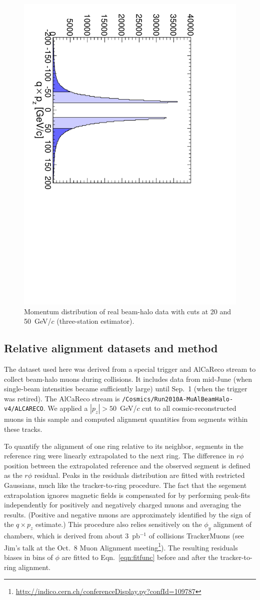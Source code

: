 \documentclass[12pt]{article}
\begin{document}
\begin{figure}
\begin{center}
\includegraphics[height=0.4\linewidth, angle=90]{qpz_spectrum.pdf}
\end{center}

\caption{Momentum distribution of real beam-halo data with cuts at 20
  and 50~GeV/$c$ (three-station estimator). \label{fig:qpz_spectrum}}
\end{figure}

\subsection{Relative alignment datasets and method}

The dataset used here was derived from a special trigger and AlCaReco
stream to collect beam-halo muons during collisions.  It includes data
from mid-June (when single-beam intensities became sufficiently large)
until Sep.~1 (when the trigger was retired).  The AlCaReco stream is
{\tt /Cosmics/Run2010A-MuAlBeamHalo-v4/ALCARECO}.  We applied a $|p_z|
> 50$~GeV/$c$ cut to all cosmic-reconstructed muons in this sample and
computed alignment quantities from segments within these tracks.

To quantify the alignment of one ring relative to its neighbor,
segments in the reference ring were linearly extrapolated to the next
ring.  The difference in $r\phi$ position between the extrapolated
reference and the observed segment is defined as the $r\phi$ residual.
Peaks in the residuals distribution are fitted with restricted
Gaussians, much like the tracker-to-ring procedure.  The fact that the
segement extrapolation ignores magnetic fields is compensated for by
performing peak-fits independently for positively and negatively
charged muons and averaging the results.  (Positive and negative muons
are approximately identified by the sign of the $q\times p_z$
estimate.)  This procedure also relies sensitively on the $\phi_y$
alignment of chambers, which is derived from about 3~pb$^{-1}$ of
collisions TrackerMuons (see Jim's talk at the Oct.~8 Muon Alignment
meeting\footnote{\url{http://indico.cern.ch/conferenceDisplay.py?confId=109787}}).
The resulting residuals biases in bins of $\phi$ are fitted to
Eqn.~\ref{eqn:fitfunc} before and after the tracker-to-ring alignment.
\end{document}
